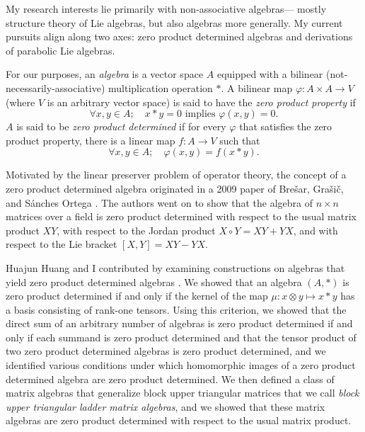 \documentclass[11pt]{article}
\begin{document}

\makeletterhead

\maketitle

\vfill

My research interests lie primarily with non-associative algebras---%
mostly structure theory of Lie algebras, but also algebras more
generally. My current pursuits align along two axes: zero product
determined algebras and derivations of parabolic Lie algebras.


For our purposes, an \emph{algebra} is a vector space $A$ equipped with
a bilinear (not-necessarily-associative) multiplication operation
$\ast$.
A bilinear map $\varphi : A \times A \to V$
(where $V$ is an arbitrary vector space)
is said to have the \emph{zero product property} if
\[
  \forall x, y \in A;\quad
  x \ast y = 0 \text{ implies } \varphi(x,y) = 0
  \text{.}
\]
$A$ is said to be \emph{zero product determined} if for every $\varphi$
that satisfies the zero product property, there is a linear map
$f : A \to V$ such that
\[
  \forall x, y \in A;\quad
  \varphi(x,y) = f(x \ast y)
  \text{.}
\]

Motivated by the linear preserver problem of operator theory, the
concept of a zero product determined algebra originated in a 2009 paper
of Bre\v{s}ar, Gra\v{s}i\v{c}, and S\'{a}nches Ortega
\cite{brevsar2009zero}. The authors went on to show that the algebra of
$n \times n$ matrices over a field is zero product determined with
respect to the usual matrix product $XY$, with respect to the Jordan
product $X \circ Y = XY + YX$, and with respect to the Lie bracket
$[X,Y] = XY - YX$.

Huajun Huang and I contributed by examining constructions on algebras
that yield zero product determined algebras
\cite{article:brice2015zero}. We showed that an algebra $(A, \ast)$ is
zero product determined if and only if the kernel of the map $\mu : x
\otimes y \mapsto x \ast y$ has a basis consisting of rank-one tensors.
Using this criterion, we showed that the direct sum of an arbitrary
number of algebras is zero product determined if and only if each
summand is zero product determined and that the tensor product of
two zero product determined algebras is zero product determined, and we
identified various conditions under which homomorphic images of a zero
product determined algebra are zero product determined. We then defined
a class of matrix algebras that generalize block upper triangular
matrices that we call \emph{block upper triangular ladder matrix
algebras}, and we showed that these matrix algebras are zero product
determined with respect to the usual matrix product.
\end{document}
